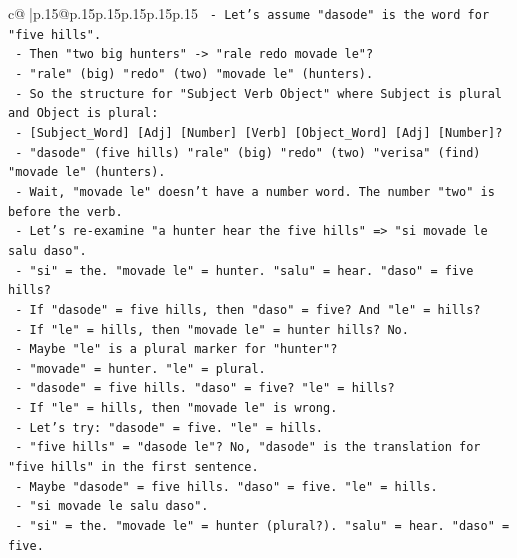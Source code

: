 \documentclass{article}
\begin{document}
{\begin{supertabular}{c@{$\;$}|p{.15\linewidth}@{}p{.15\linewidth}p{.15\linewidth}p{.15\linewidth}p{.15\linewidth}p{.15\linewidth}}
{{{\texttt{            {-} Let's assume "dasode" is the word for "five hills".} \\
\texttt{            {-} Then "two big hunters" {-}> "rale redo movade le"?} \\
\texttt{            {-} "rale" (big) "redo" (two) "movade le" (hunters).} \\
\texttt{            {-} So the structure for "Subject Verb Object" where Subject is plural and Object is plural:} \\
\texttt{              {-} {[}Subject\_Word{]} {[}Adj{]} {[}Number{]} {[}Verb{]} {[}Object\_Word{]} {[}Adj{]} {[}Number{]}?} \\
\texttt{              {-} "dasode" (five hills) "rale" (big) "redo" (two) "verisa" (find) "movade le" (hunters).} \\
\texttt{              {-} Wait, "movade le" doesn't have a number word. The number "two" is before the verb.} \\
\texttt{            {-} Let's re{-}examine "a hunter hear the five hills" => "si movade le salu daso".} \\
\texttt{              {-} "si" = the. "movade le" = hunter. "salu" = hear. "daso" = five hills?} \\
\texttt{              {-} If "dasode" = five hills, then "daso" = five? And "le" = hills?} \\
\texttt{              {-} If "le" = hills, then "movade le" = hunter hills? No.} \\
\texttt{              {-} Maybe "le" is a plural marker for "hunter"?} \\
\texttt{              {-} "movade" = hunter. "le" = plural.} \\
\texttt{              {-} "dasode" = five hills. "daso" = five? "le" = hills?} \\
\texttt{              {-} If "le" = hills, then "movade le" is wrong.} \\
\texttt{              {-} Let's try: "dasode" = five. "le" = hills.} \\
\texttt{              {-} "five hills" = "dasode le"? No, "dasode" is the translation for "five hills" in the first sentence.} \\
\texttt{              {-} Maybe "dasode" = five hills. "daso" = five. "le" = hills.} \\
\texttt{              {-} "si movade le salu daso".} \\
\texttt{              {-} "si" = the. "movade le" = hunter (plural?). "salu" = hear. "daso" = five.} \\
}}}
\end{supertabular}}
\end{document}
